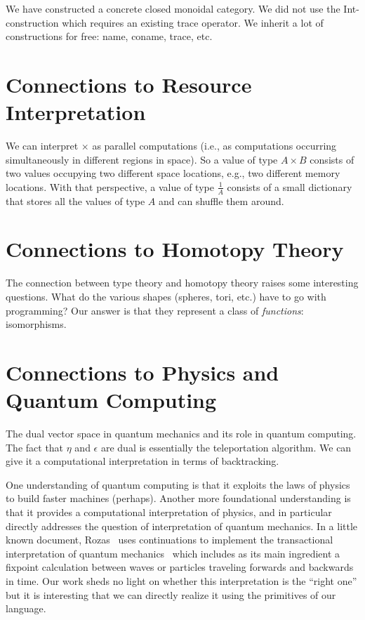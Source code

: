 \documentclass[11pt]{article}
\begin{document}
We have constructed a concrete closed monoidal category. We did not use the
Int-construction which requires an existing trace operator. We inherit a lot
of constructions for free: name, coname, trace, etc.

\section{Connections to Resource Interpretation} 

We can interpret $\times$ as parallel computations (i.e., as computations
occurring simultaneously in different regions in space). So a value of type
$A \times B$ consists of two values occupying two different space locations,
e.g., two different memory locations. With that perspective, a value of type
$\frac{1}{A}$ consists of a small dictionary that stores all the values of
type $A$ and can shuffle them around.

\section{Connections to Homotopy Theory} 

The connection between type theory and homotopy theory raises some
interesting questions. What do the various shapes (spheres, tori, etc.) have
to go with programming? Our answer is that they represent a class
of \emph{functions}: isomorphisms.

\section{Connections to Physics and Quantum Computing} 

The dual vector space in quantum mechanics and its role in quantum
computing. The fact that $\eta$ and $\epsilon$ are dual is essentially the
teleportation algorithm. We can give it a computational interpretation in
terms of backtracking.

One understanding of quantum computing is that it exploits the laws of physics
to build faster machines (perhaps). Another more foundational understanding
is that it provides a computational interpretation of physics, and in
particular directly addresses the question of interpretation of quantum
mechanics. In a little known document, Rozas~\cite{Rozas:1987:CMO:889539}
uses continuations to implement the transactional interpretation of quantum
mechanics~\cite{transactional} which includes as its main ingredient a
fixpoint calculation between waves or particles traveling forwards and
backwards in time. Our work sheds no light on whether this interpretation is
the ``right one'' but it is interesting that we can directly realize it using
the primitives of our language.
\end{document}

